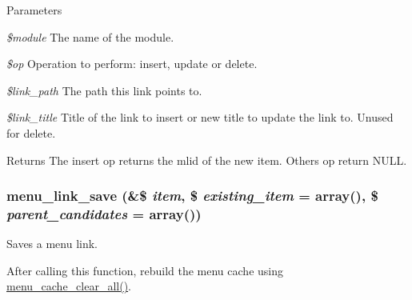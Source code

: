 \begin{DoxyParams}{Parameters}
\item[{\em \$module}]The name of the module. \item[{\em \$op}]Operation to perform: insert, update or delete. \item[{\em \$link\_\-path}]The path this link points to. \item[{\em \$link\_\-title}]Title of the link to insert or new title to update the link to. Unused for delete.\end{DoxyParams}
\begin{DoxyReturn}{Returns}
The insert op returns the mlid of the new item. Others op return NULL. 
\end{DoxyReturn}
\hypertarget{group__menu_ga133b177fee00b678a19afba18fb81ebc}{
\subsubsection[{menu\_\-link\_\-save}]{\setlength{\rightskip}{0pt plus 5cm}menu\_\-link\_\-save (\&\$ {\em item}, \/  \$ {\em existing\_\-item} = {\ttfamily array()}, \/  \$ {\em parent\_\-candidates} = {\ttfamily array()})}}
\label{group__menu_ga133b177fee00b678a19afba18fb81ebc}
Saves a menu link.

After calling this function, rebuild the menu cache using \hyperlink{group__menu_ga0a10fa44ca152a12091747e515b6a655}{menu\_\-cache\_\-clear\_\-all()}.


